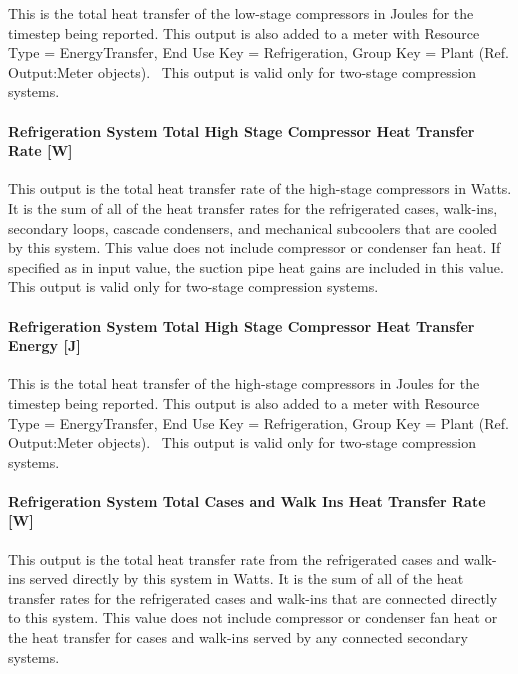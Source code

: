 This is the total heat transfer of the low-stage compressors in Joules for the timestep being reported. This output is also added to a meter with Resource Type = EnergyTransfer, End Use Key = Refrigeration, Group Key = Plant (Ref. Output:Meter objects).~ This output is valid only for two-stage compression systems.

\paragraph{Refrigeration System Total High Stage Compressor Heat Transfer Rate {[}W{]}}\label{refrigeration-system-total-high-stage-compressor-heat-transfer-rate-w}

This output is the total heat transfer rate of the high-stage compressors in Watts. It is the sum of all of the heat transfer rates for the refrigerated cases, walk-ins, secondary loops, cascade condensers, and mechanical subcoolers that are cooled by this system. This value does not include compressor or condenser fan heat. If specified as in input value, the suction pipe heat gains are included in this value.~ This output is valid only for two-stage compression systems.

\paragraph{Refrigeration System Total High Stage Compressor Heat Transfer Energy {[}J{]}}\label{refrigeration-system-total-high-stage-compressor-heat-transfer-energy-j}

This is the total heat transfer of the high-stage compressors in Joules for the timestep being reported. This output is also added to a meter with Resource Type = EnergyTransfer, End Use Key = Refrigeration, Group Key = Plant (Ref. Output:Meter objects).~ This output is valid only for two-stage compression systems.

\paragraph{Refrigeration System Total Cases and Walk Ins Heat Transfer Rate {[}W{]}}\label{refrigeration-system-total-cases-and-walk-ins-heat-transfer-rate-w}

This output is the total heat transfer rate from the refrigerated cases and walk-ins served directly by this system in Watts. It is the sum of all of the heat transfer rates for the refrigerated cases and walk-ins that are connected directly to this system. This value does not include compressor or condenser fan heat or the heat transfer for cases and walk-ins served by any connected secondary systems.

